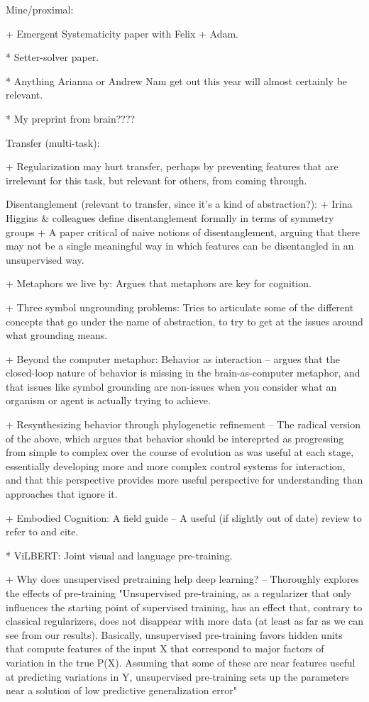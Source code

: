 Mine/proximal:

+ Emergent Systematicity paper with Felix + Adam.

* Setter-solver paper.

* Anything Arianna or Andrew Nam get out this year will almost certainly be relevant.

* My preprint from brain????


Transfer (multi-task):

+ Regularization may hurt transfer, perhaps by preventing features that are irrelevant for this task, but relevant for others, from coming through. \citep{Kornblith2019} 

    Disentanglement (relevant to transfer, since it's a kind of abstraction?):
        + Irina Higgins & colleagues define disentanglement formally in terms of symmetry groups \citep{Higgins2018}
        + A paper critical of naive notions of disentanglement, arguing that there may not be a single meaningful way in which features can be disentangled in an unsupervised way. \citep{Locatello2019}

+ Metaphors we live by: Argues that metaphors are key for cognition. \citep{Lakoff2008} 

+ Three symbol ungrounding problems: Tries to articulate some of the different concepts that go under the name of abstraction, to try to get at the issues around what grounding means. \citep{Dove2016}

+ Beyond the computer metaphor: Behavior as interaction -- argues that the closed-loop nature of behavior is missing in the brain-as-computer metaphor, and that issues like symbol grounding are non-issues when you consider what an organism or agent is actually trying to achieve. \citep{Cisek1999}

+ Resynthesizing behavior through phylogenetic refinement -- The radical version of the above, which argues that behavior should be intereprted as progressing from simple to complex over the course of evolution as was useful at each stage, essentially developing more and more complex control systems for interaction, and that this perspective provides more useful perspective for understanding than approaches that ignore it. \citep{Cisek2019}

+ Embodied Cognition: A field guide -- A useful (if slightly out of date) review to refer to and cite. \citep{Anderson2003}

* ViLBERT: Joint visual and language pre-training. \citep{Lu2019}

+ Why does unsupervised pretraining help deep learning? -- Thoroughly explores the effects of pre-training
"Unsupervised pre-training, as a regularizer that only influences the starting point of
supervised training, has an effect that, contrary to classical regularizers, does not disappear with
more data (at least as far as we can see from our results). Basically, unsupervised pre-training favors
hidden units that compute features of the input X that correspond to major factors of variation in
the true P(X). Assuming that some of these are near features useful at predicting variations in Y,
unsupervised pre-training sets up the parameters near a solution of low predictive generalization error" \citep{Erhan2010}

